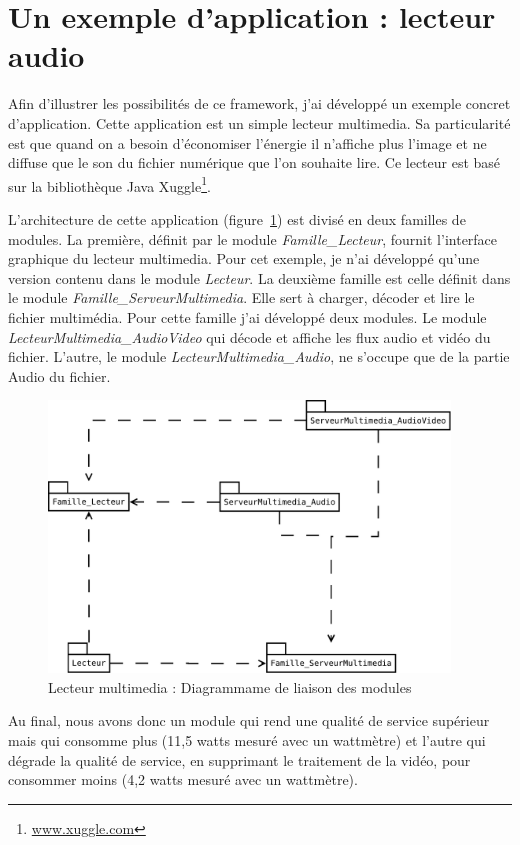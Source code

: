 \documentclass[a4paper, 11pt]{report}
\begin{document}
	\section{Un exemple d'application : lecteur audio}
Afin d'illustrer les possibilités de ce framework, j'ai développé un exemple concret d'application. Cette application est un simple lecteur multimedia. Sa particularité est que quand on a besoin d'économiser l'énergie il n'affiche plus l'image et ne diffuse que le son du fichier numérique que l'on souhaite lire. Ce lecteur est basé sur la bibliothèque Java Xuggle\footnote{\href{http://www.xuggle.com/}{www.xuggle.com}}.

L'architecture de cette application (figure~\ref{lecMult}) est divisé en deux familles de modules. La première, définit par le module \textit{Famille\_Lecteur}, fournit l'interface graphique du lecteur multimedia. Pour cet exemple, je n'ai développé qu'une version contenu dans le module \textit{Lecteur}. La deuxième famille est celle définit dans le module \textit{Famille\_ServeurMultimedia}. Elle sert à charger, décoder et lire le fichier multimédia. Pour cette famille j'ai développé deux modules. Le module \textit{LecteurMultimedia\_AudioVideo} qui décode et affiche les flux audio et vidéo du fichier. L'autre, le module \textit{LecteurMultimedia\_Audio}, ne s'occupe que de la partie Audio du fichier.

\begin{figure}
	\centering
	\includegraphics[width=0.95\textwidth]{figures/EcoPattern_LecteurMultimedia}
	\caption{Lecteur multimedia : Diagrammame de liaison des modules}
	\label{lecMult}
\end{figure}

Au final, nous avons donc un module qui rend une qualité de service supérieur mais qui consomme plus (11,5 watts mesuré avec un wattmètre) et l'autre qui dégrade la qualité de service, en supprimant le traitement de la vidéo, pour consommer moins (4,2 watts mesuré avec un wattmètre).
\end{document}
